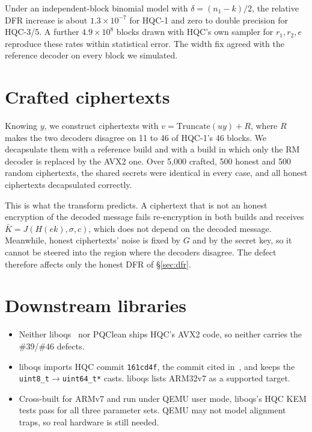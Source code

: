 \documentclass[11pt,a4paper]{article}
\begin{document}
Under an independent-block binomial model with $\delta=(n_1-k)/2$, the relative DFR increase is about $1.3\times10^{-7}$ for HQC-1 and zero to double precision for HQC-3/5. A further $4.9\times10^8$ blocks drawn with HQC's own sampler for $r_1,r_2,e$ reproduce these rates within statistical error. The width fix agreed with the reference decoder on every block we simulated.

\section{Crafted ciphertexts}\label{sec:crafted}
Knowing $y$, we construct ciphertexts with $v=\mathrm{Truncate}(uy)+R$, where $R$ makes the two decoders disagree on 11 to 46 of HQC-1's 46 blocks. We decapsulate them with a reference build and with a build in which only the RM decoder is replaced by the AVX2 one. Over 5{,}000 crafted, 500 honest and 500 random ciphertexts, the shared secrets were identical in every case, and all honest ciphertexts decapsulated correctly.

This is what the transform predicts. A ciphertext that is not an honest encryption of the decoded message fails re-encryption in both builds and receives $\bar K=J(H(ek),\sigma,c)$, which does not depend on the decoded message. Meanwhile, honest ciphertexts' noise is fixed by $G$ and by the secret key, so it cannot be steered into the region where the decoders disagree. The defect therefore affects only the honest DFR of \S\ref{sec:dfr}.

\section{Downstream libraries}\label{sec:down}
\begin{itemize}
\item Neither liboqs~\cite{liboqs} nor PQClean ships HQC's AVX2 code, so neither carries the \#39/\#46 defects.
\item liboqs imports HQC commit \texttt{161cd4f}, the commit cited in~\cite{HQC31}, and keeps the \texttt{uint8\_t}$\to$\texttt{uint64\_t*} casts. liboqs lists ARM32v7 as a supported target.
\item Cross-built for ARMv7 and run under QEMU user mode, liboqs's HQC KEM tests pass for all three parameter sets. QEMU may not model alignment traps, so real hardware is still needed.
\end{itemize}
\end{document}
